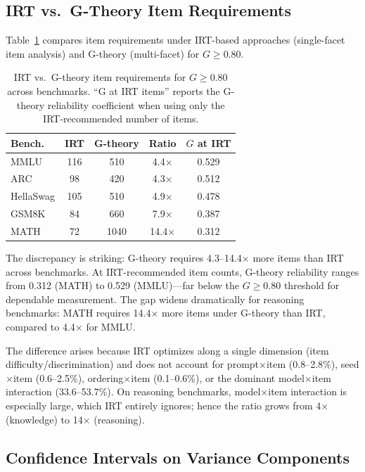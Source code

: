 \documentclass[letterpaper,11pt]{article}
\begin{document}
\subsection{IRT vs.\ G-Theory Item Requirements}
\label{sec:irt}

Table~\ref{tab:irt} compares item requirements under IRT-based approaches (single-facet item analysis) and G-theory (multi-facet) for $G \geq 0.80$.

\begin{table}[t]
\centering
\caption{IRT vs.\ G-theory item requirements for $G \geq 0.80$ across benchmarks. ``G at IRT items'' reports the G-theory reliability coefficient when using only the IRT-recommended number of items.}
\label{tab:irt}
\small
\begin{tabular}{lcccc}
\toprule
\textbf{Bench.} & \textbf{IRT} & \textbf{G-theory} & \textbf{Ratio} & \textbf{$G$ at IRT} \\
\midrule
MMLU & 116 & 510 & 4.4$\times$ & 0.529 \\
ARC & 98 & 420 & 4.3$\times$ & 0.512 \\
HellaSwag & 105 & 510 & 4.9$\times$ & 0.478 \\
GSM8K & 84 & 660 & 7.9$\times$ & 0.387 \\
MATH & 72 & 1040 & 14.4$\times$ & 0.312 \\
\bottomrule
\end{tabular}
\end{table}

The discrepancy is striking: G-theory requires 4.3--14.4$\times$ more items than IRT across benchmarks.
At IRT-recommended item counts, G-theory reliability ranges from 0.312 (MATH) to 0.529 (MMLU)---far below the $G \geq 0.80$ threshold for dependable measurement.
The gap widens dramatically for reasoning benchmarks: MATH requires 14.4$\times$ more items under G-theory than IRT, compared to 4.4$\times$ for MMLU.

The difference arises because IRT optimizes along a single dimension (item difficulty/discrimination) and does not account for prompt$\times$item (0.8--2.8\%), seed$\times$item (0.6--2.5\%), ordering$\times$item (0.1--0.6\%), or the dominant model$\times$item interaction (33.6--53.7\%).
On reasoning benchmarks, model$\times$item interaction is especially large, which IRT entirely ignores; hence the ratio grows from 4$\times$ (knowledge) to 14$\times$ (reasoning).

\subsection{Confidence Intervals on Variance Components}
\label{sec:cis}
\end{document}
